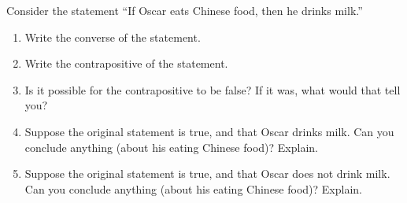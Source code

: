 \documentclass[11pt,]{book}
\theoremstyle{ptxplainnotitle}
\theoremstyle{ptxplaintitle}
\theoremstyle{ptxdefinitionnotitle}
\theoremstyle{ptxdefinitiontitle}
\theoremstyle{ptxdefinitionnotitle}
\theoremstyle{ptxdefinitiontitle}
\theoremstyle{ptxdefinitionnotitle}
\theoremstyle{ptxdefinitiontitle}
\theoremstyle{ptxdefinitiontitlenonumber}
\theoremstyle{ptxdefinitiontitlenonumber}
\numberwithin{equation}{chapter}
\begin{document}
\begin{divisionexercise}{14}\hypertarget{exercise-162}{}
\hypertarget{p-2171}{}%
Consider the statement ``If Oscar eats Chinese food, then he drinks milk.'' \leavevmode%
\begin{enumerate}[label=(\alph*)]
\item\hypertarget{li-1117}{}\hypertarget{p-2172}{}%
Write the converse of the statement.%
\item\hypertarget{li-1118}{}\hypertarget{p-2173}{}%
Write the contrapositive of the statement.%
\item\hypertarget{li-1119}{}\hypertarget{p-2174}{}%
Is it possible for the contrapositive to be false? If it was, what would that tell you?%
\item\hypertarget{li-1120}{}\hypertarget{p-2175}{}%
Suppose the original statement is true, and that Oscar drinks milk. Can you conclude anything (about his eating Chinese food)? Explain.%
\item\hypertarget{li-1121}{}\hypertarget{p-2176}{}%
Suppose the original statement is true, and that Oscar does not drink milk. Can you conclude anything (about his eating Chinese food)? Explain.%
\end{enumerate}
%
\end{divisionexercise}%
\end{document}
